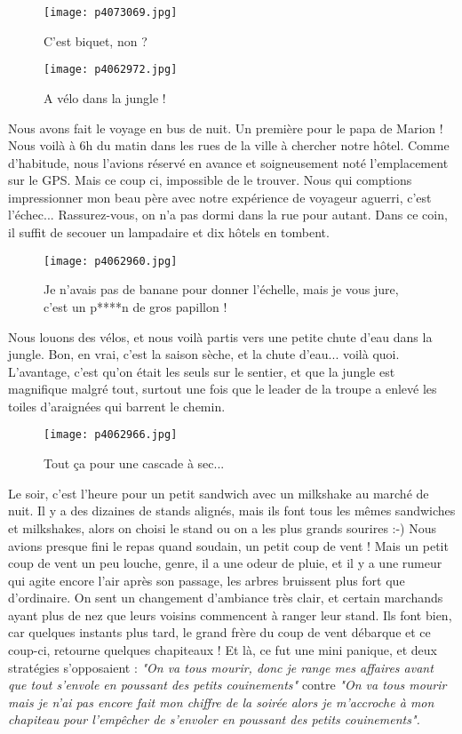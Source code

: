 \documentclass{book}
\begin{document}
\begin{figure}[h]
\centering
\texttt{[image: p4073069.jpg]}
\caption*{C'est biquet, non ?}
\end{figure}




\begin{figure}[h]
\centering
\texttt{[image: p4062972.jpg]}
\caption*{A vélo dans la jungle !}
\end{figure}

Nous avons fait le voyage en bus de nuit. Un première pour le papa de Marion ! Nous voilà à 6h du matin dans les rues de la ville à chercher notre hôtel. Comme d'habitude, nous l'avions réservé en avance et soigneusement noté l'emplacement sur le GPS. Mais ce coup ci, impossible de le trouver. Nous qui comptions impressionner mon beau père avec notre expérience de voyageur aguerri, c'est l'échec... Rassurez-vous, on n'a pas dormi dans la rue pour autant. Dans ce coin, il suffit de secouer un lampadaire et dix hôtels en tombent.


\begin{figure}[h]
\centering
\texttt{[image: p4062960.jpg]}
\caption*{Je n'avais pas de banane pour donner l'échelle, mais je vous jure, c'est un p****n de gros papillon !}
\end{figure}

Nous louons des vélos, et nous voilà partis vers une petite chute d'eau dans la jungle. Bon, en vrai, c'est la saison sèche, et la chute d'eau... voilà quoi. L'avantage, c'est qu'on était les seuls sur le sentier, et que la jungle est magnifique malgré tout, surtout une fois que le leader de la troupe a enlevé les toiles d'araignées qui barrent le chemin.


\begin{figure}[h]
\centering
\texttt{[image: p4062966.jpg]}
\caption*{Tout ça pour une cascade à sec...}
\end{figure}

Le soir, c'est l'heure pour un petit sandwich avec un milkshake au marché de nuit. Il y a des dizaines de stands alignés, mais ils font tous les mêmes sandwiches et milkshakes, alors on choisi le stand ou on a les plus grands sourires :-)
Nous avions presque fini le repas quand soudain, un petit coup de vent ! Mais un petit coup de vent un peu louche, genre, il a une odeur de pluie, et il y a une rumeur qui agite encore l'air après son passage, les arbres bruissent plus fort que d'ordinaire. On sent un changement d'ambiance très clair, et certain marchands ayant plus de nez que leurs voisins commencent à ranger leur stand. Ils font bien, car quelques instants plus tard, le grand frère du coup de vent débarque et ce coup-ci, retourne quelques chapiteaux ! Et là, ce fut une mini panique, et deux stratégies s'opposaient :
\emph{"On va tous mourir, donc je range mes affaires avant que tout s'envole en poussant des petits couinements"}
contre
\emph{"On va tous mourir mais je n'ai pas encore fait mon chiffre de la soirée alors je m'accroche à mon chapiteau pour l'empêcher de s'envoler en poussant des petits couinements".}
\end{document}
